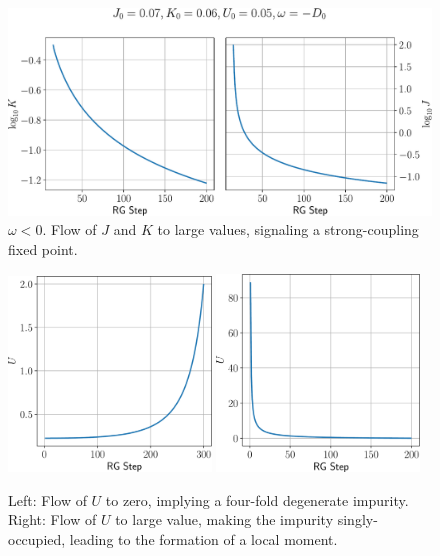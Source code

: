 \documentclass[twoside]{report}
\numberwithin{equation}{section}
\begin{document}
\begin{figure}[htpb!]
	\centering
	\includegraphics[width=\textwidth]{../figures/low_w_JK.pdf}
	\caption{\(\omega < 0\). Flow of \(J\) and \(K\) to large values, signaling a strong-coupling fixed point.}
	\label{J_sc}
\end{figure}
\begin{figure}[htpb]
	\centering
	\includegraphics[width=0.48\textwidth]{../figures/U_irr.pdf}
	\includegraphics[width=0.48\textwidth]{../figures/U_rel.pdf}
	\caption{Left: Flow of \(U\) to zero, implying a four-fold degenerate impurity. Right: Flow of \(U\) to large value, making the impurity singly-occupied, leading to the formation of a local moment.}
	\label{U_flow}
\end{figure}
\end{document}
